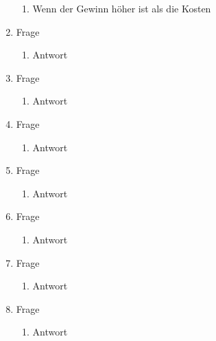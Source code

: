 \documentclass[12pt,a4paper]{article}
\begin{document}
\begin{enumerate}
	\begin{enumerate}
		\item Wenn der Gewinn höher ist als die Kosten
	\end{enumerate}
	\item Frage
	\begin{enumerate}
		\item Antwort
	\end{enumerate}
	\item Frage
	\begin{enumerate}
		\item Antwort
	\end{enumerate}
	\item Frage
	\begin{enumerate}
		\item Antwort
	\end{enumerate}
	\item Frage
	\begin{enumerate}
		\item Antwort
	\end{enumerate}
	\item Frage
	\begin{enumerate}
		\item Antwort
	\end{enumerate}
	\item Frage
	\begin{enumerate}
		\item Antwort
	\end{enumerate}
	\item Frage
	\begin{enumerate}
		\item Antwort
	\end{enumerate}
\end{enumerate}
\end{document}
